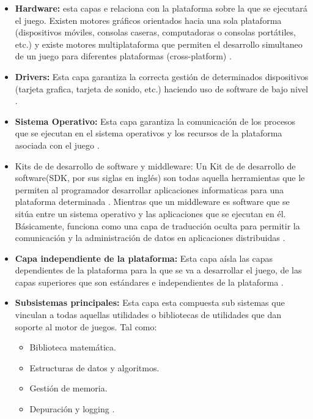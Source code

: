 	 \begin{itemize}
	 	\item \textbf{Hardware:} esta capas e relaciona con la plataforma sobre la que 
	 	se ejecutará el juego. Existen motores gráficos orientados hacia una sola 
	 	plataforma (dispositivos móviles, consolas caseras, computadoras o consolas 
	 	portátiles, etc.) y existe motores multiplataforma que permiten el desarrollo 
	 	simultaneo de un juego para diferentes plataformas (cross-platform) 
	 	\cite{Ref:ArquMotor}.
	 	\item \textbf{Drivers:} Esta capa garantiza la correcta gestión de determinados 
	 	dispositivos (tarjeta grafica, tarjeta de sonido, etc.) haciendo uso de software 
	 	de bajo nivel \cite{Ref:ArquMotor}. 
	 	\item \textbf{Sistema Operativo:} Esta capa garantiza la comunicación de los
	 	 procesos que se ejecutan en el sistema operativos y los recursos de la 
	 	 plataforma 
	 	 asociada con el juego \cite{Ref:ArquMotor}.
	 	\item {Kits de de desarrollo de software y middleware:} Un Kit de de desarrollo 
	 	de software(SDK, por sus siglas en inglés) son todas aquella herramientas que le 
	 	 permiten al programador desarrollar aplicaciones informaticas para una 
	 	 plataforma determinada \cite{ref:SDK}. Mientras que un middleware es 
	 	 software que se sitúa entre un sistema operativo y las aplicaciones que se 
	 	 ejecutan en él. Básicamente, funciona como una capa de traducción oculta para 
	 	 permitir la comunicación y la administración de datos en aplicaciones 
	 	 distribuidas \cite{Ref:middleware}. 
	 	\item \textbf{Capa independiente de la plataforma:} Esta capa aísla las capas 
	 	dependientes de la plataforma para la que se va a desarrollar el juego, de las 
	 	capas superiores que son estándares e independientes de la plataforma
	 	\cite{Ref:ArquMotor}. 
	 	\item \textbf{Subsistemas principales:} Esta capa esta compuesta sub sistemas 
	 	que vinculan a todas aquellas utilidades o bibliotecas de utilidades que dan 
	 	soporte al motor de juegos. Tal como:
	 	\begin{itemize}
	 		\item Biblioteca matemática.
	 		\item Estructuras de datos y algoritmos.
	 		\item Gestión de memoria.
	 		\item Depuración y logging \cite{Ref:ArquMotor}.
	 	\end{itemize}

\end{itemize}
